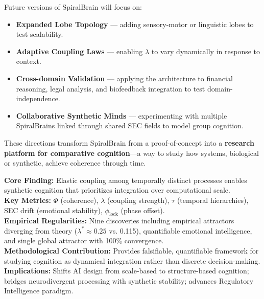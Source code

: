 \documentclass[11pt,a4paper]{article}
\begin{document}
Future versions of SpiralBrain will focus on:

\begin{itemize}
\item \textbf{Expanded Lobe Topology} --- adding sensory-motor or linguistic lobes to test scalability.
\item \textbf{Adaptive Coupling Laws} --- enabling $\lambda$ to vary dynamically in response to context.
\item \textbf{Cross-domain Validation} --- applying the architecture to financial reasoning, legal analysis, and biofeedback integration to test domain-independence.
\item \textbf{Collaborative Synthetic Minds} --- experimenting with multiple SpiralBrains linked through shared SEC fields to model group cognition.
\end{itemize}

These directions transform SpiralBrain from a proof-of-concept into a \textbf{research platform for comparative cognition}---a way to study how systems, biological or synthetic, achieve coherence through time.

\begin{tcolorbox}[colback=blue!5, colframe=blue, title=Key Takeaways for Skimming Readers]
\textbf{Core Finding:} Elastic coupling among temporally distinct processes enables synthetic cognition that prioritizes integration over computational scale.\\

\textbf{Key Metrics:} $\Phi$ (coherence), $\lambda$ (coupling strength), $\tau$ (temporal hierarchies), SEC drift (emotional stability), $\phi_{\text{lock}}$ (phase offset).\\

\textbf{Empirical Regularities:} Nine discoveries including empirical attractors diverging from theory ($\lambda^* \approx 0.25$ vs. 0.115), quantifiable emotional intelligence, and single global attractor with 100\% convergence.\\

\textbf{Methodological Contribution:} Provides falsifiable, quantifiable framework for studying cognition as dynamical integration rather than discrete decision-making.\\

\textbf{Implications:} Shifts AI design from scale-based to structure-based cognition; bridges neurodivergent processing with synthetic stability; advances Regulatory Intelligence paradigm.\\
\end{tcolorbox}
\end{document}
